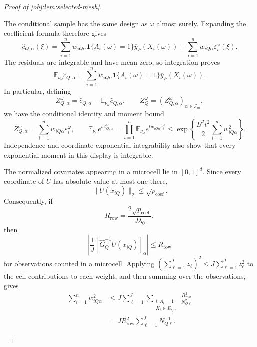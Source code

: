 \begin{proof}[Proof of \cref{obj:lem:selected-mesh}]
\begin{enumerate}
The conditional sample has the same design as \(\omega\) almost surely.
Expanding the coefficient formula therefore gives
\[
\widehat c_{Q,\alpha}(\xi)
=
\sum_{i=1}^n w_{iQ\alpha}
\mathbf1\{A_i(\omega)=1\}\overline y_P(X_i(\omega))
+
\sum_{i=1}^n w_{iQ\alpha}\varepsilon_i^\omega(\xi).
\]
The residuals are integrable and have mean zero, so integration proves
\[
\mathbb E_{\nu_\omega}\widehat c_{Q,\alpha}
=
\sum_{i=1}^n w_{iQ\alpha}
\mathbf1\{A_i(\omega)=1\}\overline y_P(X_i(\omega)).
\]
In particular, defining
\[
Z_{Q,\alpha}^\omega
=
\widehat c_{Q,\alpha}
-\mathbb E_{\nu_\omega}\widehat c_{Q,\alpha},
\qquad
Z_Q^\omega=(Z_{Q,\alpha}^\omega)_{\alpha\in\mathcal I_m},
\]
we have the conditional identity and moment bound
\[
Z_{Q,\alpha}^\omega
=
\sum_{i=1}^n w_{iQ\alpha}\varepsilon_i^\omega,
\qquad
\mathbb E_{\nu_\omega}e^{tZ_{Q,\alpha}^\omega}
=
\prod_{i=1}^n
\mathbb E_{\nu_\omega}e^{tw_{iQ\alpha}\varepsilon_i^\omega}
\le
\exp\!\left\{
\frac{B^2t^2}{2}\sum_{i=1}^n w_{iQ\alpha}^2
\right\}.
\]
Independence and coordinate exponential integrability also show that
every exponential moment in this display is integrable.

The normalized covariates appearing in a microcell lie in
\([0,1]^d\). Since every coordinate of \(U\) has absolute value at most
one there,
\[
\|U(x_{iQ})\|_2\le\sqrt{p_{\mathrm{coef}}}.
\]
Consequently, if
\[
R_{\mathrm{row}}
=
\frac{2\sqrt{p_{\mathrm{coef}}}}{J\lambda_0},
\]
then
\[
\left|
\frac1J[\widehat G_Q^{-1}U(x_{iQ})]_\alpha
\right|\le R_{\mathrm{row}}
\]
for observations counted in a microcell. Applying
\((\sum_{\ell=1}^{J}z_\ell)^2\le J\sum_{\ell=1}^{J}z_\ell^2\)
to the cell contributions to each weight, and then summing over the
observations, gives
\[
\begin{aligned}
\sum_{i=1}^n w_{iQ\alpha}^2
&\le
J\sum_{\ell=1}^{J}
\sum_{\substack{i:A_i=1\\X_i\in E_{Q\ell}}}
\frac{R_{\mathrm{row}}^2}{N_{Q\ell}^2}\\
&=
JR_{\mathrm{row}}^2\sum_{\ell=1}^{J}N_{Q\ell}^{-1}.
\end{aligned}
\]


\end{enumerate}
\end{proof}
